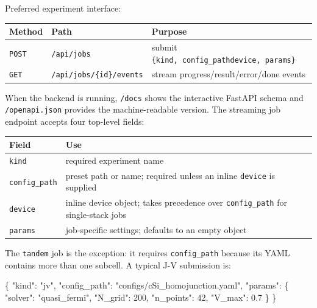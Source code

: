\documentclass[
  11pt,
  american,
]{report}
\newenvironment{Shaded}{}{}
\newcommand{\DataTypeTok}[1]{\textcolor[rgb]{0.56,0.13,0.00}{#1}}
\newcommand{\DecValTok}[1]{\textcolor[rgb]{0.25,0.63,0.44}{#1}}
\newcommand{\FloatTok}[1]{\textcolor[rgb]{0.25,0.63,0.44}{#1}}
\newcommand{\FunctionTok}[1]{\textcolor[rgb]{0.02,0.16,0.49}{#1}}
\newcommand{\StringTok}[1]{\textcolor[rgb]{0.25,0.44,0.63}{#1}}
\begin{document}
Preferred experiment interface:

\begin{longtable}[]{@{}lll@{}}
\toprule
Method & Path & Purpose \\
\midrule
\endhead
\texttt{POST} & \texttt{/api/jobs} & submit
\texttt{\{kind,\ config\_path\textbar{}device,\ params\}} \\
\texttt{GET} & \texttt{/api/jobs/\{id\}/events} & stream
progress/result/error/done events \\
\bottomrule
\end{longtable}

When the backend is running, \texttt{/docs} shows the interactive
FastAPI schema and \texttt{/openapi.json} provides the machine-readable
version. The streaming job endpoint accepts four top-level fields:

\begin{longtable}[]{@{}
  >{\raggedright\arraybackslash}p{}
  >{\raggedright\arraybackslash}p{}@{}}
\toprule
Field & Use \\
\midrule
\endhead
\texttt{kind} & required experiment name \\
\texttt{config\_path} & preset path or name; required unless an inline
\texttt{device} is supplied \\
\texttt{device} & inline device object; takes precedence over
\texttt{config\_path} for single-stack jobs \\
\texttt{params} & job-specific settings; defaults to an empty object \\
\bottomrule
\end{longtable}

The \texttt{tandem} job is the exception: it requires
\texttt{config\_path} because its YAML contains more than one subcell. A
typical J-V submission is:

\begin{Shaded}
\begin{Highlighting}[]
\FunctionTok{\{}
  \DataTypeTok{"kind"}\FunctionTok{:} \StringTok{"jv"}\FunctionTok{,}
  \DataTypeTok{"config\_path"}\FunctionTok{:} \StringTok{"configs/cSi\_homojunction.yaml"}\FunctionTok{,}
  \DataTypeTok{"params"}\FunctionTok{:} \FunctionTok{\{}
    \DataTypeTok{"solver"}\FunctionTok{:} \StringTok{"quasi\_fermi"}\FunctionTok{,}
    \DataTypeTok{"N\_grid"}\FunctionTok{:} \DecValTok{200}\FunctionTok{,}
    \DataTypeTok{"n\_points"}\FunctionTok{:} \DecValTok{42}\FunctionTok{,}
    \DataTypeTok{"V\_max"}\FunctionTok{:} \FloatTok{0.7}
  \FunctionTok{\}}
\FunctionTok{\}}
\end{Highlighting}
\end{Shaded}
\end{document}

